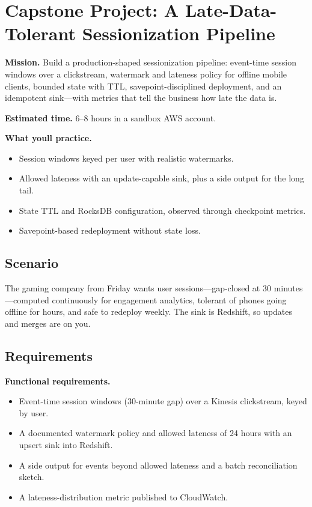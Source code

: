 \section{Capstone Project: A Late-Data-Tolerant Sessionization Pipeline}\label{sec:ch15-capstone}

\begin{capstonebox}
\textbf{Mission.} Build a production-shaped sessionization pipeline: event-time session windows over a clickstream, watermark and lateness policy for offline mobile clients, bounded state with TTL, savepoint-disciplined deployment, and an idempotent sink---with metrics that tell the business how late the data is.

\textbf{Estimated time.} 6--8 hours in a sandbox AWS account.

\textbf{What you\textquotesingle{}ll practice.}
\begin{itemize}
    \item Session windows keyed per user with realistic watermarks.
    \item Allowed lateness with an update-capable sink, plus a side output for the long tail.
    \item State TTL and RocksDB configuration, observed through checkpoint metrics.
    \item Savepoint-based redeployment without state loss.
\end{itemize}
\end{capstonebox}

\subsection*{Scenario}
The gaming company from Friday wants user sessions---gap-closed at 30 minutes---computed continuously for engagement analytics, tolerant of phones going offline for hours, and safe to redeploy weekly. The sink is Redshift, so updates and merges are on you.

\subsection*{Requirements}
\textbf{Functional requirements.}
\begin{itemize}
    \item Event-time session windows (30-minute gap) over a Kinesis clickstream, keyed by user.
    \item A documented watermark policy and allowed lateness of 24 hours with an upsert sink into Redshift.
    \item A side output for events beyond allowed lateness and a batch reconciliation sketch.
    \item A lateness-distribution metric published to CloudWatch.
\end{itemize}

